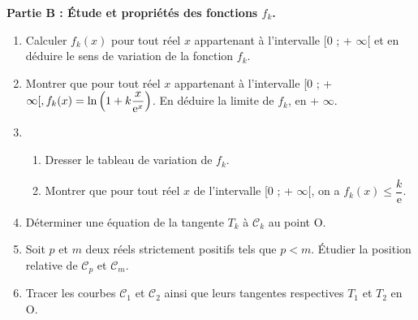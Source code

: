 \begin{exercice}
\noindent \textbf{Partie B : \'Etude et propri\'et\'es des fonctions 
\boldmath $f_{k}$\unboldmath .} 

\begin{enumerate} \item Calculer $f_{k}(x)$ pour tout r\'eel $x$ appartenant \`a 
l'intervalle [0 ; + $\infty$[ et en d\'eduire le sens de variation de la fonction 
$f_{k}$. 

\item Montrer que pour tout r\'eel $x$ appartenant \`a 
l'intervalle [0 ; + $\infty[,~\\f_{k}(x) = \ln \left(1 + 
k\dfrac{x}{\text{e}^x}\right)$. En d\'eduire la limite de $f_{k}$, en + 
$\infty$. 

\item \begin{enumerate} \item Dresser le tableau de variation 
de $f_{k}$. 

\item Montrer que pour tout r\'eel $x$ de l'intervalle [0 ; + $\infty[$, 
on a $f_{k}(x) \leqslant \dfrac{k}{\text{e}}$. 

\end{enumerate} 

\item D\'eterminer une \'equation de la tangente $T_{k}$ 
\`a $\mathcal{C}_{k}$ au point O. 

\item Soit $p$ et $m$ deux r\'eels strictement positifs tels 
que $p < m$. \'Etudier la position relative de $\mathcal{C}_{p}$ et 
$\mathcal{C}_{m}$. 

\item Tracer les courbes $\mathcal{C}_{1}$ et 
$\mathcal{C}_{2}$ ainsi que leurs tangentes respectives $T_{1}$ 
et $T_{2}$ en O. 

\end{enumerate} 
\end{exercice}
